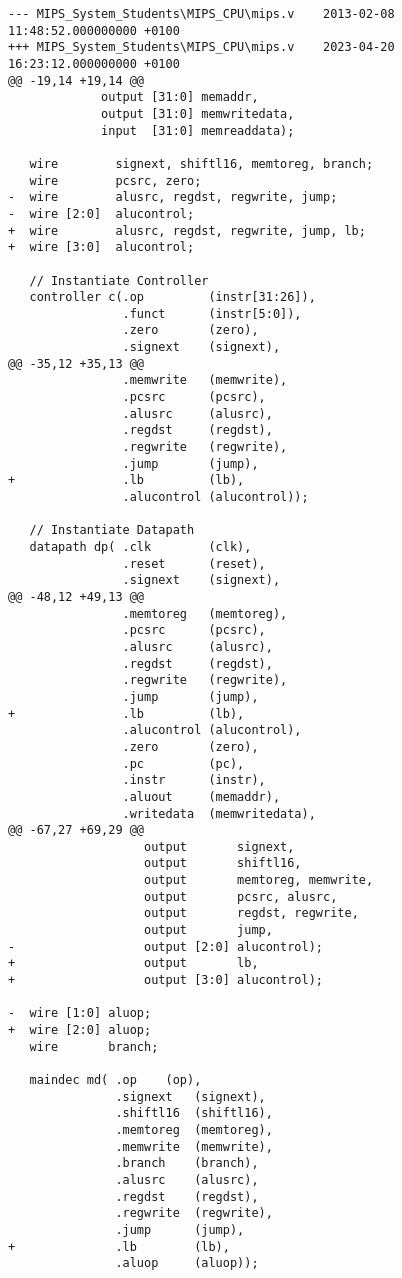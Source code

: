 \begin{verbatim}
--- MIPS_System_Students\MIPS_CPU\mips.v	2013-02-08 11:48:52.000000000 +0100
+++ MIPS_System_Students\MIPS_CPU\mips.v	2023-04-20 16:23:12.000000000 +0100
@@ -19,14 +19,14 @@
             output [31:0] memaddr,
             output [31:0] memwritedata,
             input  [31:0] memreaddata);
 
   wire        signext, shiftl16, memtoreg, branch;
   wire        pcsrc, zero;
-  wire        alusrc, regdst, regwrite, jump;
-  wire [2:0]  alucontrol;
+  wire        alusrc, regdst, regwrite, jump, lb;
+  wire [3:0]  alucontrol;
 
   // Instantiate Controller
   controller c(.op         (instr[31:26]), 
                .funct      (instr[5:0]), 
                .zero       (zero),
                .signext    (signext), 
@@ -35,12 +35,13 @@
                .memwrite   (memwrite), 
                .pcsrc      (pcsrc),
                .alusrc     (alusrc), 
                .regdst     (regdst), 
                .regwrite   (regwrite), 
                .jump       (jump),
+               .lb         (lb),
                .alucontrol (alucontrol));
 
   // Instantiate Datapath
   datapath dp( .clk        (clk), 
                .reset      (reset), 
                .signext    (signext), 
@@ -48,12 +49,13 @@
                .memtoreg   (memtoreg), 
                .pcsrc      (pcsrc),
                .alusrc     (alusrc), 
                .regdst     (regdst), 
                .regwrite   (regwrite), 
                .jump       (jump),
+               .lb         (lb),
                .alucontrol (alucontrol),
                .zero       (zero), 
                .pc         (pc), 
                .instr      (instr),
                .aluout     (memaddr), 
                .writedata  (memwritedata), 
@@ -67,27 +69,29 @@
                   output       signext,
                   output       shiftl16,
                   output       memtoreg, memwrite,
                   output       pcsrc, alusrc,
                   output       regdst, regwrite,
                   output       jump,
-                  output [2:0] alucontrol);
+                  output       lb,
+                  output [3:0] alucontrol);
 
-  wire [1:0] aluop;
+  wire [2:0] aluop;
   wire       branch;
 
   maindec md( .op    (op), 
               .signext   (signext), 
               .shiftl16  (shiftl16), 
               .memtoreg  (memtoreg), 
               .memwrite  (memwrite), 
               .branch    (branch),
               .alusrc    (alusrc), 
               .regdst    (regdst), 
               .regwrite  (regwrite), 
               .jump      (jump),
+              .lb        (lb),
               .aluop     (aluop));
 

\end{verbatim}
